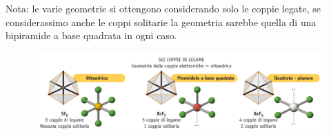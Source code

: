 \vspace{0.2cm}Nota: le varie geometrie si ottengono considerando solo le coppie legate, se considerassimo anche le coppi solitarie la geometria sarebbe quella di una bipiramide a base quadrata in ogni caso.

\begin{figure}[htp]
    \centering
    \includegraphics[width=14cm]{immagini/geometrie-6-coppie.png}
\end{figure}